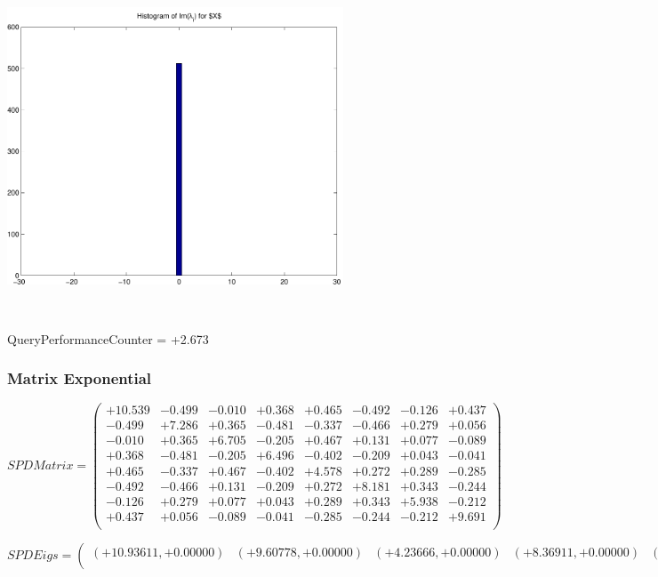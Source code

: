 \documentclass[9pt]{article}
\theoremstyle{plain}
\theoremstyle{definition}
\theoremstyle{remark}
\numberwithin{equation}{section}
\begin{document}
\includegraphics[width=10.0cm,height=10.0cm]{Im_lambda_n.pdf}

QueryPerformanceCounter  =  +2.673
\subsubsection{Matrix Exponential }
$SPD Matrix = \left(
\begin{array}{
cccccccc}
+10.539 & -0.499 & -0.010 & +0.368 & +0.465 & -0.492 & -0.126 & +0.437 \\
-0.499 & +7.286 & +0.365 & -0.481 & -0.337 & -0.466 & +0.279 & +0.056 \\
-0.010 & +0.365 & +6.705 & -0.205 & +0.467 & +0.131 & +0.077 & -0.089 \\
+0.368 & -0.481 & -0.205 & +6.496 & -0.402 & -0.209 & +0.043 & -0.041 \\
+0.465 & -0.337 & +0.467 & -0.402 & +4.578 & +0.272 & +0.289 & -0.285 \\
-0.492 & -0.466 & +0.131 & -0.209 & +0.272 & +8.181 & +0.343 & -0.244 \\
-0.126 & +0.279 & +0.077 & +0.043 & +0.289 & +0.343 & +5.938 & -0.212 \\
+0.437 & +0.056 & -0.089 & -0.041 & -0.285 & -0.244 & -0.212 & +9.691 \\
\end{array}
\right)$ \newline 

$SPD Eigs = \left(
\begin{array}{
cccccccc}
(+10.93611,+0.00000) & (+9.60778,+0.00000) & (+4.23666,+0.00000) & (+8.36911,+0.00000) & (+7.56229,+0.00000) & (+5.82791,+0.00000) & (+6.54198,+0.00000) & (+6.33139,+0.00000) \\
\end{array}
\right)$ \newline 
\end{document}
